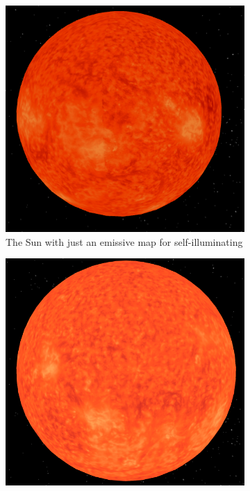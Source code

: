\documentclass[12pt]{article}
\begin{document}
\begin{figure}[H]
        \centering
        \begin{subfigure}[b]{0.4\textwidth}
                \includegraphics[width=\textwidth]{images/sunemissive}
                \caption{The Sun with just an emissive map for self-illuminating}
                \label{fig:Self-illuminating Sun with emissive map.}
       \end{subfigure}
        \begin{subfigure}[b]{0.4\textwidth}
                \includegraphics[width=\textwidth]{images/sunemissiveandambient}

\end{subfigure}
\end{figure}
\end{document}
